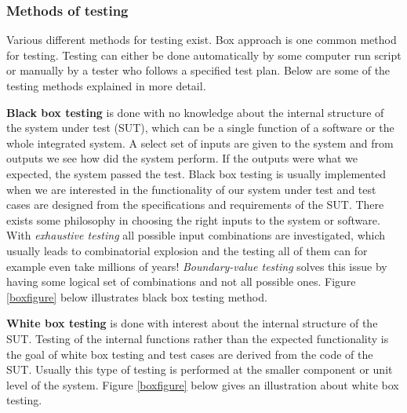 \documentclass[english,12pt,a4paper,pdftex,elec,utf8]{aaltothesis}
\begin{document}
\subsubsection{Methods of testing}
Various different methods for testing exist. Box approach is one common method for testing. Testing can either be done automatically by some computer run script or manually by a tester who follows a specified test plan. \cite{sularikurssi} Below are some of the testing methods explained in more detail.\par 
\textbf{Black box testing} is done with no knowledge about the internal structure of the system under test (SUT), which can be a single function of a software or the whole integrated system. A select set of inputs are given to the system and from outputs we see how did the system perform. If the outputs were what we expected, the system passed the test. Black box testing is usually implemented when we are interested in the functionality of our system under test and test cases are designed from the specifications and requirements of the SUT. There exists some philosophy in choosing the right inputs to the system or software. With \textit{exhaustive testing} all possible input combinations are investigated, which usually leads to combinatorial explosion and the testing all of them can for example even take millions of years! \textit{Boundary-value testing} solves this issue by having some logical set of combinations and not all possible ones. Figure \ref{boxfigure} below illustrates black box testing method. \cite{sularikurssi}\par 
\textbf{White box testing} is done with interest about the internal structure of the SUT. Testing of the internal functions rather than the expected functionality is the goal of white box testing and test cases are derived from the code of the SUT. Usually this type of testing is performed at the smaller component or unit level of the system. Figure \ref{boxfigure} below gives an illustration about white box testing. \cite{sularikurssi}\par
\end{document}
